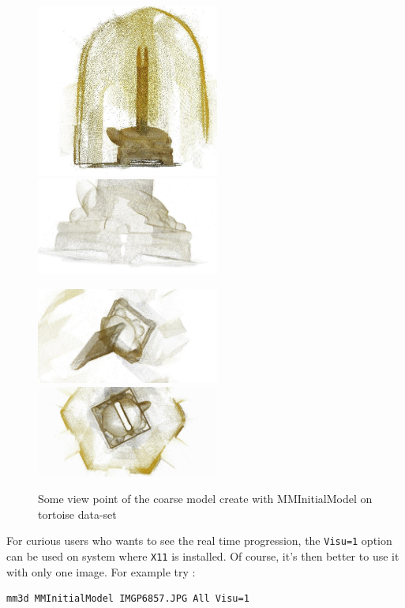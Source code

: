 \begin{figure}
\begin{center}
\includegraphics[width=60mm]{FIGS/Tortue/snapshot00.jpg}
\includegraphics[width=60mm]{FIGS/Tortue/snapshot01.jpg}

\includegraphics[width=60mm]{FIGS/Tortue/snapshot02.jpg}
\includegraphics[width=60mm]{FIGS/Tortue/snapshot03.jpg}
\end{center}
\caption{Some view point of the coarse model create with MMInitialModel on tortoise data-set}
\label{FIG:Tortue:Output}
\end{figure}



For curious users who wants to see the real time progression,  the {\tt Visu=1} option can be
used on system where {\tt X11} is installed. Of course, it's then better to use it with only one
image. For example try :


\begin{verbatim}
mm3d MMInitialModel IMGP6857.JPG All Visu=1
\end{verbatim}

